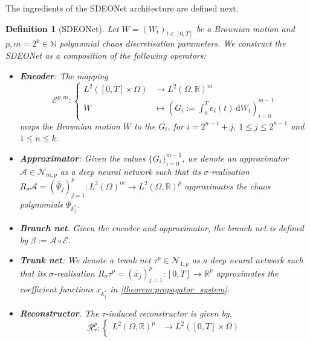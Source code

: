 \documentclass[12pt]{article}
\newtheorem{definition}[theorem]{Definition}
\theoremstyle{remark}
\theoremstyle{plain}
\numberwithin{equation}{section}
\newcommand{\dd}{\ensuremath{\,\mathrm d}}
\newcommand{\N}{\mathbb{N}}
\newcommand{\R}{\mathbb{R}}
\newcommand{\charles}[1]{\textcolor{CharlesColor}{#1}}
\begin{document}
The ingredients of the SDEONet architecture are defined next.
\begin{definition}[SDEONet]\label{def:sde_deeponet}
    Let $W = (W_t)_{t \in [0,T]}$ be a Brownian motion and $p,m=2^k \in \N$ polynomial chaos discretisation parameters.
    We construct the SDEONet as a composition of the following operators:
    \begin{itemize}
        \item \textbf{Encoder}: The mapping
        \begin{equation}
            \mathcal E^{p,m} :
            \left\{
            \begin{aligned}
                L^2([0,T] \times \Omega) &\longrightarrow L^2(\Omega, \R)^{m}\\
                W &\longmapsto \left(G_i := \int_0^T e_i(t)\dd W_t\right)_{i=0}^{m-1}
            \end{aligned}
            \right.
            \label{eq:sde_deeponet_encoder}
        \end{equation}
        maps the Brownian motion $W$ to the $G_i$,
        for $i = 2^{n-1} + j$, $1 \leq j \leq 2^{n-1}$ and $1 \leq n \leq k$.
        \item \textbf{Approximator}: Given the values $\{G_i\}_{i=0}^{m-1}$, we denote an \emph{approximator} $\mathcal A \in \mathcal N_{m,p}$ as a deep neural network such that its $\sigma$-realisation $R_\sigma \mathcal A = (\widetilde{\Psi_j})_{j=1}^p : L^2(\Omega)^m \to L^2(\Omega, \R)^p$ approximates the \emph{chaos polynomials} $\Psi_{k_j^*}$.
        \item \textbf{Branch net}. Given the \emph{encoder} and \emph{approximator}, the \emph{branch net} is defined by $\beta := \mathcal A \circ \mathcal E$.
        \item \textbf{Trunk net}: We denote a \emph{trunk net} $\tau^p \in \mathcal N_{1,p}$ as a deep neural network such that its $\sigma$-realisation $R_\sigma\tau^p = (\widetilde{x_j})_{j=1}^p : [0,T] \to \R^{p}$ approximates the coefficient functions $x_{k_j^*}$ in \cref{theorem:propagator_system}.
        \item \textbf{Reconstructor}. The $\tau$-induced \emph{reconstructor} is given by,
        \begin{equation}
            \mathcal R_\tau^p : \left\{
            \begin{array}{rl}
                 L^2(\Omega, \R)^p &\longrightarrow L^2([0,T] \times \Omega) \\

\end{array}
\end{equation}
\end{itemize}
\end{definition}
\end{document}
